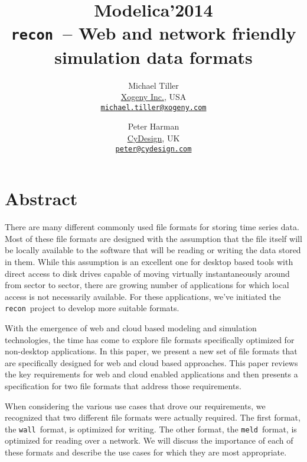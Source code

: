 \documentclass[11pt,a4paper,twocolumn]{article}
\newcommand{\recon}{\texttt{recon}}
\newcommand{\wall}{\texttt{wall}}
\newcommand{\meld}{\texttt{meld}}
\begin{document}
\title{\textbf{{\small Modelica'2014}\\
    \recon\  -- Web and network friendly simulation data formats}}

\author{Michael Tiller\\
  \href{http://xogeny.com}{Xogeny Inc.}, USA\\
  \href{mailto:michael.tiller@xogeny.com}
       {\nolinkurl{michael.tiller@xogeny.com}}
  \and Peter Harman\\
  \href{http://www.cydesign.com}
       {CyDesign}, UK\\
  \href{mailto:peter@cydesign.com}{\nolinkurl{peter@cydesign.com}}}
\date{} %
\maketitle\thispagestyle{empty} %

\section*{Abstract}

There are many different commonly used file formats for storing time
series data.  Most of these file formats are designed with the
assumption that the file itself will be locally available to the
software that will be reading or writing the data stored in them.
While this assumption is an excellent one for desktop based tools with
direct access to disk drives capable of moving virtually
instantaneously around from sector to sector, there are growing number
of applications for which local access is not necessarily available.
For these applications, we've initiated the \recon\ project to develop
more suitable formats.

With the emergence of web and cloud based modeling and simulation
technologies, the time has come to explore file formats specifically
optimized for non-desktop applications.  In this paper, we present a
new set of file formats that are specifically designed for web and
cloud based approaches.  This paper reviews the key requirements for
web and cloud enabled applications and then presents a specification
for two file formats that address those requirements.

When considering the various use cases that drove our requirements, we
recognized that two different file formats were actually required.
The first format, the \wall\ format, is optimized for writing.  The
other format, the \meld\ format, is optimized for reading over a
network.  We will discuss the importance of each of these formats and
describe the use cases for which they are most appropriate.
\end{document}
